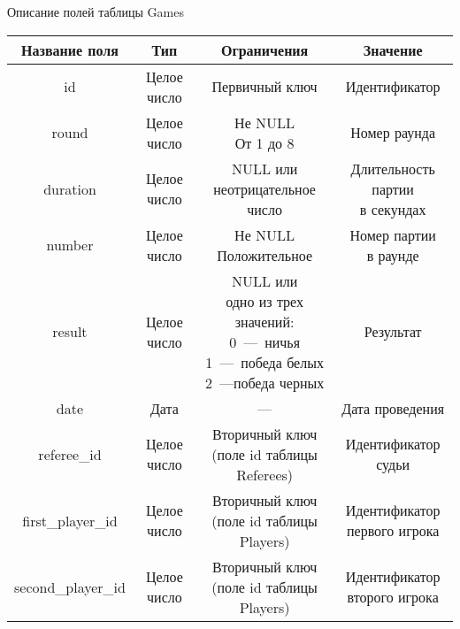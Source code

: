 \begin{center}
	\begin{threeparttable}
		\captionsetup{justification=raggedright,singlelinecheck=off}
		\caption{\label{games_table}Описание полей таблицы Games}
		\centering
		\begin{tabular}{|c|c|c|c|}
			\hline
			Название поля & Тип & Ограничения & Значение \\
			\hline
			id & Целое число & Первичный ключ & Идентификатор \\
			\hline
			round & Целое число & \specialcell{Не NULL\\От 1 до 8} & Номер раунда \\
			\hline
			duration & Целое число & \specialcell{NULL или\\неотрицательное число} & \specialcell{Длительность партии\\в секундах} \\
			\hline
			number & Целое число & \specialcell{Не NULL\\Положительное} & \specialcell{Номер партии\\в раунде} \\
			\hline
			result & Целое число & \specialcell{NULL или\\одно из трех\\значений:\\0~---~ничья\\1~---~победа белых\\2~---победа черных} & Результат \\
			\hline
			date & Дата & --- & Дата проведения \\
			\hline
			referee\_id & Целое число & \specialcell{Вторичный ключ\\(поле id таблицы Referees)} & \specialcell{Идентификатор\\судьи}\\
			\hline
			first\_player\_id & Целое число & \specialcell{Вторичный ключ\\(поле id таблицы Players)} & \specialcell{Идентификатор\\первого игрока}\\
			\hline
			second\_player\_id & Целое число & \specialcell{Вторичный ключ\\(поле id таблицы Players)} & \specialcell{Идентификатор\\второго игрока}\\
			\hline
		\end{tabular}
	\end{threeparttable}
\end{center}
